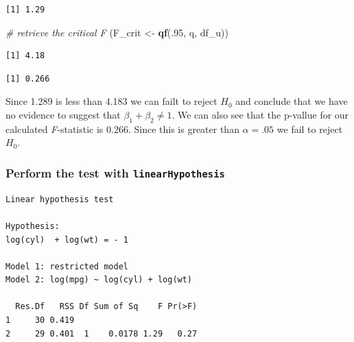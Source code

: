 \documentclass[]{book}
\newenvironment{Shaded}{\begin{snugshade}}{\end{snugshade}}
\newcommand{\CommentTok}[1]{\textcolor[rgb]{0.56,0.35,0.01}{\textit{#1}}}
\newcommand{\DataTypeTok}[1]{\textcolor[rgb]{0.13,0.29,0.53}{#1}}
\newcommand{\DecValTok}[1]{\textcolor[rgb]{0.00,0.00,0.81}{#1}}
\newcommand{\KeywordTok}[1]{\textcolor[rgb]{0.13,0.29,0.53}{\textbf{#1}}}
\newcommand{\NormalTok}[1]{#1}
\newcommand{\OperatorTok}[1]{\textcolor[rgb]{0.81,0.36,0.00}{\textbf{#1}}}
\newcommand{\StringTok}[1]{\textcolor[rgb]{0.31,0.60,0.02}{#1}}
\begin{document}
\begin{verbatim}
[1] 1.29
\end{verbatim}

\begin{Shaded}
\begin{Highlighting}[]
\CommentTok{# retrieve the critical F}
\NormalTok{(F_crit <-}\StringTok{ }\KeywordTok{qf}\NormalTok{(.}\DecValTok{95}\NormalTok{, q, df_u))}
\end{Highlighting}
\end{Shaded}

\begin{verbatim}
[1] 4.18
\end{verbatim}

\begin{Shaded}
\end{Shaded}

\begin{verbatim}
[1] 0.266
\end{verbatim}

Since 1.289 is less than 4.183 we can failt to reject \(H_0\) and conclude that we have no evidence to suggest that \(\beta_1+\beta_2\ne1\). We can also see that the p-vallue for our calculated \emph{F}-statistic is 0.266. Since this is greater than \(\alpha=.05\) we fail to reject \(H_0\).

\hypertarget{perform-the-test-with-linearhypothesis-1}{%
\subsubsection{\texorpdfstring{Perform the test with \texttt{linearHypothesis}}{Perform the test with linearHypothesis}}\label{perform-the-test-with-linearhypothesis-1}}

\begin{Shaded}
\end{Shaded}

\begin{verbatim}
Linear hypothesis test

Hypothesis:
log(cyl)  + log(wt) = - 1

Model 1: restricted model
Model 2: log(mpg) ~ log(cyl) + log(wt)

  Res.Df   RSS Df Sum of Sq    F Pr(>F)
1     30 0.419                         
2     29 0.401  1    0.0178 1.29   0.27
\end{verbatim}
\end{document}
